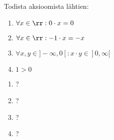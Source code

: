 \begin{tehtava}
Todista aksioomista lähtien:
\begin{enumerate}[(1)]
\item $\forall x \in \rr: 0 \cdot x = 0$
\item $\forall x \in \rr: -1 \cdot x = -x$
\item $\forall x, y \in ]-\infty,0[: x \cdot y \in ]0,\infty[$
\item $1 > 0$
\end{enumerate}
\begin{vastaus}
\begin{enumerate}[(1)]
    \item ? %
    \item ? %
    \item ? %
    \item ? %
\end{enumerate}
\end{vastaus}
\end{tehtava}

